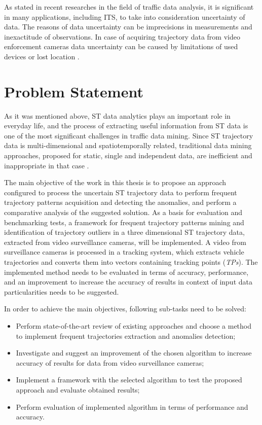As stated in recent researches in the field of traffic data analysis, it is significant in many applications, including ITS, to take into consideration uncertainty of data. The reasons of data uncertainty can be imprecisions in measurements and inexactitude of observations. In case of acquiring trajectory data from video enforcement cameras data uncertainty can be caused by limitations of used devices or lost location \cite{inproceedings:14_mpfstsp_gp_ud}.

\section{Problem Statement}

As it was mentioned above, ST data analytics plays an important role in everyday life, and the process of extracting useful information from ST data is one of the most significant challenges in traffic data mining. Since ST trajectory data is multi-dimensional and spatiotemporally related, traditional data mining approaches, proposed for static, single and independent data, are inefficient and inappropriate in that case \cite{article:8_review_mot_cl_alg}.

The main objective of the work in this thesis is to propose an approach configured to process the uncertain ST trajectory data to perform frequent trajectory patterns acquisition and detecting the anomalies, and perform a comparative analysis of the suggested solution. As a basis for evaluation and benchmarking tests, a framework for frequent trajectory patterns mining and identification of trajectory outliers in a three dimensional ST trajectory data, extracted from video surveillance cameras, will be implemented. A video from surveillance cameras is processed in a tracking system, which extracts vehicle trajectories and converts them into vectors containing tracking points (\textit{TPs}). The implemented method needs to be evaluated in terms of accuracy, performance, and an improvement to increase the accuracy of results in context of input data particularities needs to be suggested. 

In order to achieve the main objectives, following sub-tasks need to be solved:

\begin{itemize}
	\setlength\itemsep{0em}
	\item Perform state-of-the-art review of existing approaches and choose a method to implement frequent trajectories extraction and anomalies detection;
	\item Investigate and suggest an improvement of the chosen algorithm to increase accuracy of results for data from video surveillance cameras;
	\item Implement a framework with the selected algorithm to test the proposed approach and evaluate obtained results;
	\item Perform evaluation of implemented algorithm in terms of performance and accuracy.
\end{itemize}

